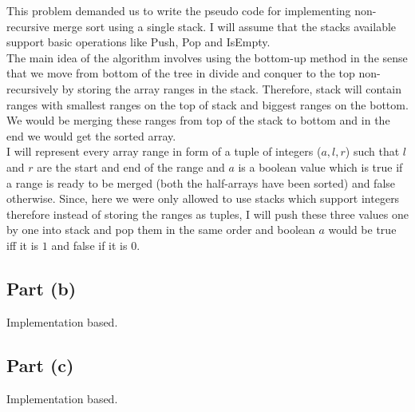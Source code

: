 \documentclass{article}
\begin{document}
{{{\begin{algorithm2e}[H]
        \end{algorithm2e}
        }
        \newpage 
        \noindent This problem demanded us to write the pseudo code for implementing non-recursive merge sort using a single stack. I will assume that the stacks available support basic operations like Push, Pop and IsEmpty. \\ 
        
        \noindent The main idea of the algorithm involves using the bottom-up method in the sense that we move from bottom of the tree in divide and conquer to the top non-recursively by storing the array ranges in the stack. Therefore, stack will contain ranges with smallest ranges on the top of stack and biggest ranges on the bottom. We would be merging these ranges from top of the stack to bottom and in the end we would get the sorted array. \\
        
        \noindent I will represent every array range in form of a tuple of integers ($a, l, r$) such that $l$ and $r$ are the start and end of the range and $a$ is a boolean value which is true if a range is ready to be merged (both the half-arrays have been sorted) and false otherwise. Since, here we were only allowed to use stacks which support integers therefore instead of storing the ranges as tuples, I will push these three values one by one into stack and pop them in the same order and boolean $a$ would be true iff it is $1$ and false if it is $0$. 
    }
    \subsection {Part (b)} {
        Implementation based.
    }
    \subsection {Part (c)} {
        Implementation based.
    }
}
\end{document}

